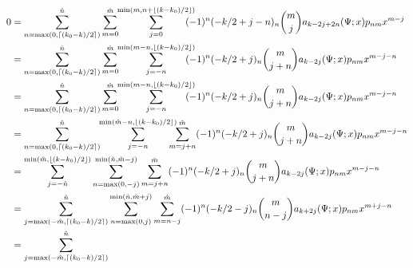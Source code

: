 \documentclass[a4paper,10pt,fleqn]{scrartcl}
\begin{document}
    \begin{align*}
        0
        &=
        \sum_{n=\max\left(0,\lceil (k_0-k)/2 \rceil\right)}^{\hat n}
        \sum_{m=0}^{\hat m}
        \hspace{-3pt}
        \sum_{j=0}^{\min\left(m,n+\lfloor (k-k_0)/2 \rfloor\right)}
        \hspace{-10pt}
        (-1)^n
        (-k/2+j-n)_n
        \binom{m}{j}
        a_{k-2j+2n}(\Psi;x)
        p_{nm} x^{m-j}
        \\
        &=
        \sum_{n=\max\left(0,\lceil (k_0-k)/2 \rceil\right)}^{\hat n}
        \sum_{m=0}^{\hat m}
        \hspace{-3pt}
        \sum_{j=-n}^{\min\left(m-n,\lfloor (k-k_0)/2 \rfloor\right)}
        \hspace{-10pt}
        (-1)^n
        (-k/2+j)_n
        \binom{m}{j+n}
        a_{k-2j}(\Psi;x)
        p_{nm} x^{m-j-n}
        \\
        &=
        \sum_{n=\max\left(0,\lceil (k_0-k)/2 \rceil\right)}^{\hat n}
        \sum_{m=0}^{\hat m}
        \hspace{-3pt}
        \sum_{j=-n}^{\min\left(m-n,\lfloor (k-k_0)/2 \rfloor\right)}
        \hspace{-10pt}
        (-1)^n
        (-k/2+j)_n
        \binom{m}{j+n}
        a_{k-2j}(\Psi;x)
        p_{nm} x^{m-j-n}
        \\
        &=
        \sum_{n=\max\left(0,\lceil (k_0-k)/2 \rceil\right)}^{\hat n}
        \hspace{-3pt}
        \sum_{j=-n}^{\min\left(\hat m-n,\lfloor (k-k_0)/2 \rfloor\right)}
        \hspace{-10pt}
        \sum_{m=j+n}^{\hat m}
        (-1)^n
        (-k/2+j)_n
        \binom{m}{j+n}
        a_{k-2j}(\Psi;x)
        p_{nm} x^{m-j-n}
        \\
        &=
        \sum_{j=-\hat n}^{\min\left(\hat m,\lfloor (k-k_0)/2 \rfloor\right)}
        \sum_{n=\max(0,-j)}^{\min(\hat n,\hat m-j)}
        \sum_{m=j+n}^{\hat m}
        (-1)^n
        (-k/2+j)_n
        \binom{m}{j+n}
        a_{k-2j}(\Psi;x)
        p_{nm} x^{m-j-n}
        \\
        &=
        \sum_{j=\max\left(-\hat m,\lceil (k_0-k)/2 \rceil\right)}^{\hat n}
        \sum_{n=\max(0,j)}^{\min(\hat n,\hat m+j)}
        \sum_{m=n-j}^{\hat m}
        (-1)^n
        (-k/2-j)_n
        \binom{m}{n-j}
        a_{k+2j}(\Psi;x)
        p_{nm} x^{m+j-n}
        \\
        &=
        \sum_{j=\max\left(-\hat m,\lceil (k_0-k)/2 \rceil\right)}^{\hat n}

\end{align*}
\end{document}
